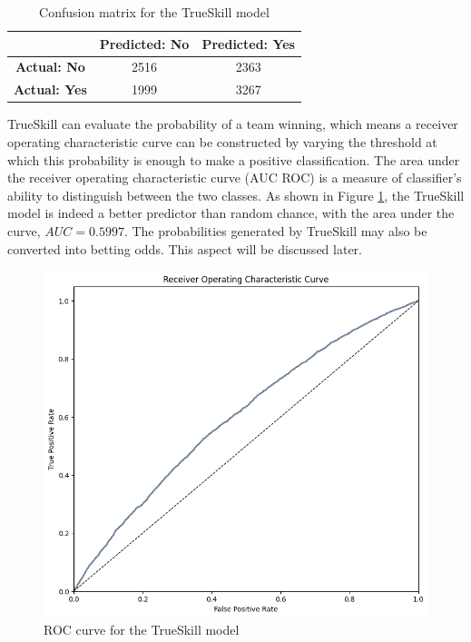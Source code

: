 \begin{table}[h]
	\centering
	\begin{tabular}{c|c|c|}
		\cline{2-3}
		& \textbf{Predicted: No} & \textbf{Predicted: Yes} \\ \hline
		\multicolumn{1}{|c|}{\textbf{Actual: No}} & 2516 & 2363 \\ \hline
		\multicolumn{1}{|c|}{\textbf{Actual: Yes}} & 1999 & 3267 \\ \hline
	\end{tabular}
	\caption{Confusion matrix for the TrueSkill model}
	\label{tab:ts-conf}
\end{table}

TrueSkill can evaluate the probability of a team winning, which means a receiver operating characteristic curve can be constructed by varying the threshold at which this probability is enough to make a positive classification. The area under the receiver operating characteristic curve (AUC ROC) is a measure of classifier's ability to distinguish between the two classes. As shown in Figure \ref{fig:ts-roc}, the TrueSkill model is indeed a better predictor than random chance, with the area under the curve, $AUC = 0.5997$. The probabilities generated by TrueSkill may also be converted into betting odds. This aspect will be discussed later.
 
\begin{figure}[h]
	\centering
	\includegraphics[width=\textwidth]{Figures/ts-auc.png}
	\caption{ROC curve for the TrueSkill model}
	\label{fig:ts-roc}
\end{figure}

